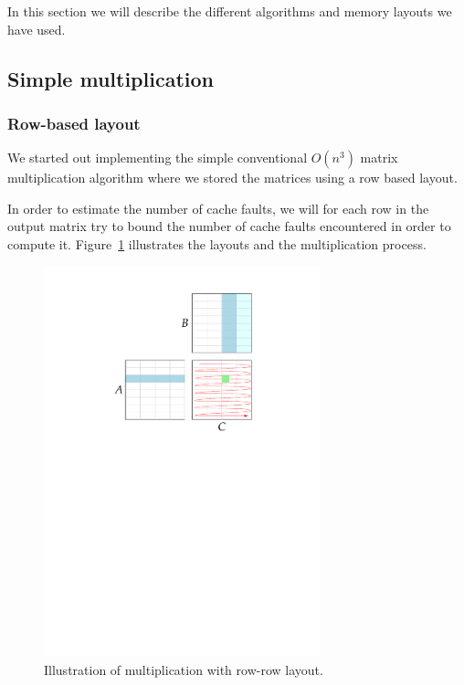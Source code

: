 In this section we will describe the different algorithms and memory
layouts we have used.

\subsection{Simple multiplication}

\subsubsection{Row-based layout}
We started out implementing the simple conventional $O(n^3)$ matrix
multiplication algorithm where we stored the matrices using a row
based layout.

In order to estimate the number of cache faults, we will for each row
in the output matrix try to bound the number of cache faults
encountered in order to compute it. Figure~\ref{fig:rowrowmul}
illustrates the layouts and the multiplication process.
\begin{figure}[h!]
  \centering
  \includegraphics[width=8cm]{images/rowrowmul}
  \caption{Illustration of multiplication with row-row layout.}
  \label{fig:rowrowmul}
\end{figure}

